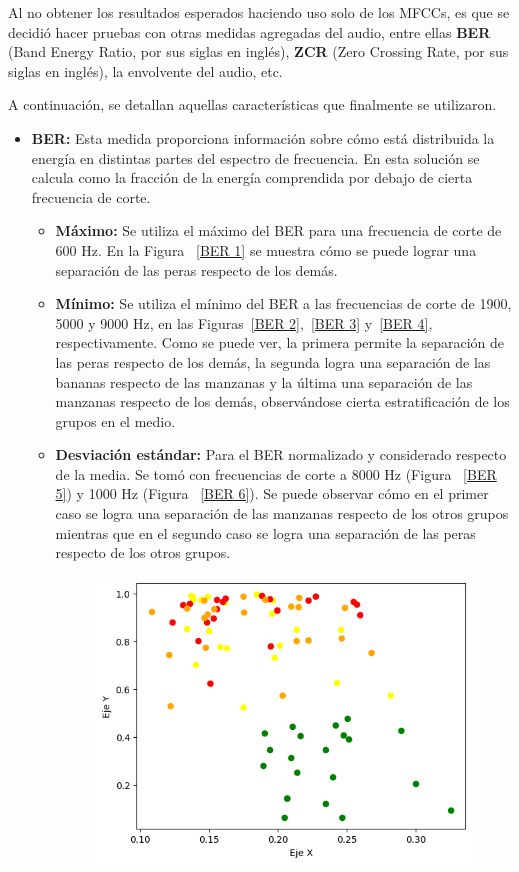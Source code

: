 \documentclass[a4paper, 12pt]{article}
\begin{document}
Al no obtener los resultados esperados haciendo uso solo de los MFCCs, es que se decidió hacer pruebas con otras medidas agregadas del audio, entre ellas \textbf{BER} (Band Energy Ratio, por sus siglas en inglés), \textbf{ZCR} (Zero Crossing Rate, por sus siglas en inglés), la envolvente del audio, etc.

A continuación, se detallan aquellas características que finalmente se utilizaron.

\begin{itemize}
    \item \textbf{BER:} Esta medida proporciona información sobre cómo está distribuida la energía en distintas partes del espectro de frecuencia. En esta solución se calcula como la fracción de la energía comprendida por debajo de cierta frecuencia de corte.
    \begin{itemize}
        \item \textbf{Máximo:} Se utiliza el máximo del BER para una frecuencia de corte de 600 Hz. En la Figura ~\ref{BER 1} se muestra cómo se puede lograr una separación de las peras respecto de los demás.
        \item \textbf{Mínimo:} Se utiliza el mínimo del BER a las frecuencias de corte de 1900, 5000 y 9000 Hz, en las Figuras~\ref{BER 2},~\ref{BER 3} y~\ref{BER 4}, respectivamente. Como se puede ver, la primera permite la separación de las peras respecto de los demás, la segunda logra una separación de las bananas respecto de las manzanas y la última una separación de las manzanas respecto de los demás, observándose cierta estratificación de los grupos en el medio.
        \item \textbf{Desviación estándar:} Para el BER normalizado y considerado respecto de la media. Se tomó con frecuencias de corte a 8000 Hz (Figura ~\ref{BER 5}) y 1000 Hz (Figura ~\ref{BER 6}). Se puede observar cómo en el primer caso se logra una separación de las manzanas respecto de los otros grupos mientras que en el segundo caso se logra una separación de las peras respecto de los otros grupos.
            \begin{figure}[htbp]
                \begin{minipage}[t]{0.5\textwidth}
                    \centering
                    \includegraphics[width=0.8\linewidth]{BER1.png}

\end{minipage}
\end{figure}
\end{itemize}
\end{itemize}
\end{document}

